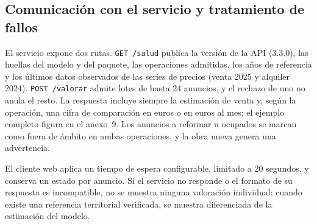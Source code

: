 \documentclass[11pt,a4paper]{article}
\newcounter{anexo}
\newcounter{anexosub}[anexo]
\begin{document}
\begingroup
\renewcommand{\thefigure}{A2}
\begin{center}
\label{fig:chat}
\end{center}
\endgroup

%
\subsection*{\theanexo\hspace{0.3em}\hspace{0.45em}Comunicación con el servicio y tratamiento de fallos}

El servicio expone dos rutas. \texttt{GET /salud} publica la versión de la API (3.3.0), las huellas del modelo y del paquete, las operaciones admitidas, los años de referencia y los últimos datos observados de las series de precios (venta 2025 y alquiler 2024). \texttt{POST /valorar} admite lotes de hasta 24 anuncios, y el rechazo de uno no anula el resto. La respuesta incluye siempre la estimación de venta y, según la operación, una cifra de comparación en euros o en euros al mes; el ejemplo completo figura en el anexo~9. Los anuncios a reformar u ocupados se marcan como fuera de ámbito en ambas operaciones, y la obra nueva genera una advertencia.

El cliente web aplica un tiempo de espera configurable, limitado a 20 segundos, y conserva un estado por anuncio. Si el servicio no responde o el formato de su respuesta es incompatible, no se muestra ninguna valoración individual; cuando existe una referencia territorial verificada, se muestra diferenciada de la estimación del modelo.
\end{document}

